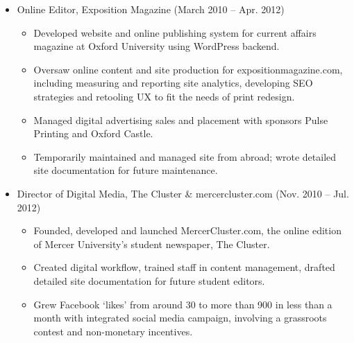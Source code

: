 \documentclass{article}
\begin{document}
\begin{itemize}[noitemsep,topsep=\mdcompacttopsep]
\item{}Online Editor, Exposition Magazine (March 2010 – Apr. 2012)

\begin{itemize}[noitemsep,topsep=\mdcompacttopsep]%

\item{}Developed website and online publishing system for current affairs magazine at Oxford University using WordPress backend.%

\item{}Oversaw online content and site production for expositionmagazine.com, including measuring and reporting site analytics, developing SEO strategies and retooling UX to fit the needs of print redesign.%

\item{}Managed digital advertising sales and placement with sponsors Pulse Printing and Oxford Castle.%

\item{}Temporarily maintained and managed site from abroad; wrote detailed site documentation for future maintenance.%
\end{itemize}%

\item{}Director of Digital Media, The Cluster \& mercercluster.com (Nov. 2010 – Jul. 2012)

\begin{itemize}[noitemsep,topsep=\mdcompacttopsep]%

\item{}Founded, developed and launched MercerCluster.com, the online edition of Mercer University's student newspaper, The Cluster.%

\item{}Created digital workflow, trained staff in content management, drafted detailed site documentation for future student editors.%

\item{}Grew Facebook ‘likes’ from around 30 to more than 900 in less than a month with integrated social media campaign, involving a grassroots contest and non-monetary incentives.%
\end{itemize}%


\end{itemize}
\end{document}
